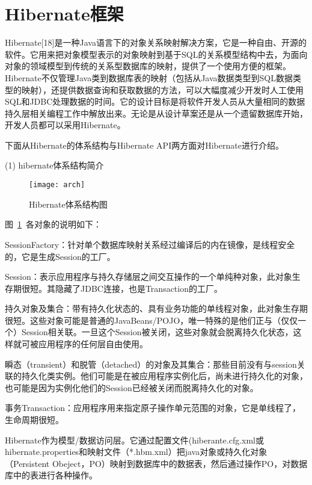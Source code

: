 \section{Hibernate框架}
Hibernate[18]是一种Java语言下的对象关系映射解决方案，它是一种自由、开源的软件。它用来把对象模型表示的对象映射到基于SQL的关系模型结构中去，为面向对象的领域模型到传统的关系型数据库的映射，提供了一个使用方便的框架。Hibernate不仅管理Java类到数据库表的映射（包括从Java数据类型到SQL数据类型的映射），还提供数据查询和获取数据的方法，可以大幅度减少开发时人工使用SQL和JDBC处理数据的时间。它的设计目标是将软件开发人员从大量相同的数据持久层相关编程工作中解放出来。无论是从设计草案还是从一个遗留数据库开始，开发人员都可以采用Hibernate。

下面从Hibernate的体系结构与Hibernate API两方面对Hibernate进行介绍。

(1) hibernate体系结构简介
\begin{figure}[htbp]
\centering
\texttt{[image: arch]}
\caption{Hibernate体系结构图}\label{fig:arch}
\vspace{\baselineskip}
\end{figure}
图~\ref{fig:arch}~各对象的说明如下：\par
SessionFactory：针对单个数据库映射关系经过编译后的内在镜像，是线程安全的，它是生成Session的工厂。\par
Session：表示应用程序与持久存储层之间交互操作的一个单纯种对象，此对象生存期很短。其隐藏了JDBC连接，也是Transaction的工厂。\par
持久对象及集合：带有持久化状态的、具有业务功能的单线程对象，此对象生存期很短。这些对象可能是普通的JavaBeans/POJO，唯一特殊的是他们正与（仅仅一个）Session相关联。一旦这个Session被关闭，这些对象就会脱离持久化状态，这样就可被应用程序的任何层自由使用。\par
瞬态（transient）和脱管（detached）的对象及其集合：那些目前没有与session关联的持久化类实例。他们可能是在被应用程序实例化后，尚未进行持久化的对象，也可能是因为实例化他们的Session已经被关闭而脱离持久化的对象。\par
事务Transaction：应用程序用来指定原子操作单元范围的对象，它是单线程了，生命周期很短。\par
Hibernate作为模型/数据访问层。它通过配置文件(hiberante.cfg.xml或hibernate.properties和映射文件（*.hbm.xml）把java对象或持久化对象（Persistent Obeject，PO）映射到数据库中的数据表，然后通过操作PO，对数据库中的表进行各种操作。

